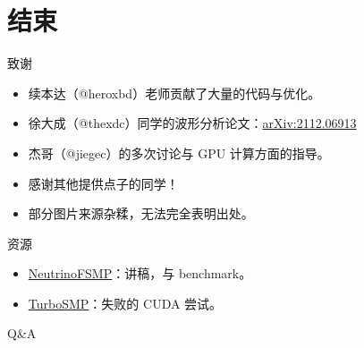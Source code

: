 \documentclass[aspectratio=169]{beamer}
\begin{document}
\section{结束}
\begin{frame}

    \begin{block}{致谢}
        \begin{itemize}
            \item 续本达（@heroxbd）老师贡献了大量的代码与优化。
            \item 徐大成（@thexdc）同学的波形分析论文：\href{https://arxiv.org/abs/2112.06913}{arXiv:2112.06913}
            \item 杰哥（@jiegec）的多次讨论与 GPU 计算方面的指导。
            \item 感谢其他提供点子的同学！
            \item 部分图片来源杂糅，无法完全表明出处。
        \end{itemize}
    \end{block}

    \begin{block}{资源}
        \begin{itemize}
            \item \href{https://github.com/Berrysoft/NeutrinoFSMP}{NeutrinoFSMP}：讲稿，与 benchmark。
            \item \href{https://github.com/Berrysoft/TurboSMP}{TurboSMP}：失败的 CUDA 尝试。
        \end{itemize}
    \end{block}

\end{frame}

\begin{frame}[noframenumbering]

    \begin{minipage}{1\textwidth}
        \centering Q\&A
    \end{minipage}

\end{frame}
\end{document}
